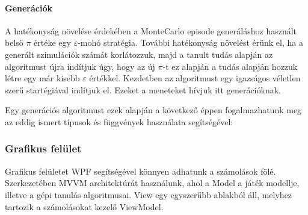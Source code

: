 \documentclass[12pt]{article}
\begin{document}
	\paragraph{Generációk}
	A hatékonyság növelése érdekében a MonteCarlo episode generáláshoz használt belső $\pi$ értéke egy $\varepsilon$-mohó stratégia. További hatékonyság növelést érünk el, ha a generált szimulációk számát korlátozzuk, majd a tanult tudás alapján az algoritmust újra indítjuk úgy, hogy az új $\pi$-t ez alapján a tudás alapján hozzuk létre egy már kisebb $\varepsilon$ értékkel. Kezdetben az algoritmust egy igazságos véletlen szerű startégiával indítjuk el. Ezeket a meneteket hívjuk itt generációknak.
	
	Egy generációs algoritmust ezek alapján a következő éppen fogalmazhatunk meg az eddig ismert típusok és függvények használata segítségével:
	
	\vspace{1cm}
	\noindent{}
	\vspace{1.5 em}
	
	\subsubsection{Grafikus felület}
	
	Grafikus felületet WPF segítségével könnyen adhatunk a számolások fölé. Szerkezetében MVVM architektúrát használunk, ahol a Model a játék modellje, illetve a gépi tanulás algoritmusai. View egy egyszerűbb ablakból áll, melyhez tartozik a számolásokat kezelő ViewModel. 
	
\end{document}
